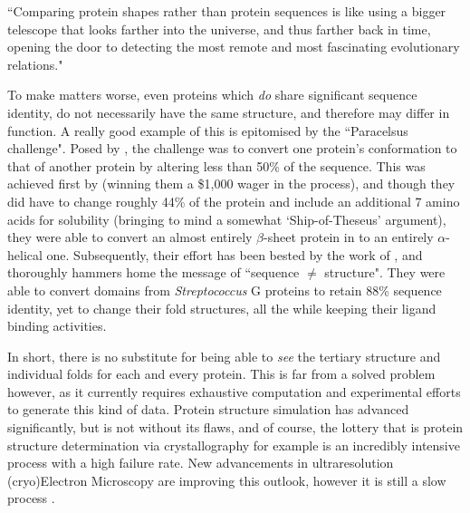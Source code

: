 \begin{displayquote}
``Comparing protein shapes rather than protein sequences is like using a bigger telescope that looks farther into the universe, and thus farther back in time, opening the door to detecting the most remote and most fascinating evolutionary relations."
\end{displayquote}

To make matters worse, even proteins which \emph{do} share significant sequence identity, do not necessarily have the same structure, and therefore may differ in function. A really good example of this is epitomised by the ``Paracelsus challenge". Posed by \cite{Rose1994}, the challenge was to convert one protein's conformation to that of another protein by altering less than 50\% of the sequence. This was achieved first by \cite{Dalal1997} (winning them a \$1,000 wager in the process), and though they did have to change roughly 44\% of the protein and include an additional 7 amino acids for solubility (bringing to mind a somewhat `Ship-of-Theseus' argument), they were able to convert an almost entirely $\beta$-sheet protein in to an entirely $\alpha$-helical one. Subsequently, their effort has been bested by the work of \cite{Alexander2007}, and thoroughly hammers home the message of ``sequence $\neq$ structure". They were able to convert domains from \emph{Streptococcus} G proteins to retain 88\% sequence identity, yet to change their fold structures, all the while keeping their ligand binding activities.

In short, there is no substitute for being able to \emph{see} the tertiary structure and individual folds for each and every protein. This is far from a solved problem however, as it currently requires exhaustive computation and experimental efforts to generate this kind of data. Protein structure simulation has advanced significantly, but is not without its flaws, and of course, the lottery that is protein structure determination via crystallography for example is an incredibly intensive process with a high failure rate. New advancements in ultraresolution (cryo)Electron Microscopy are improving this outlook, however it is still a slow process \citep{Kuhlbrandt2014}.

